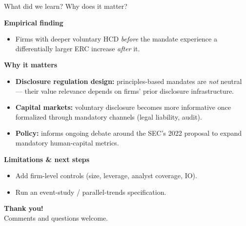 \documentclass[aspectratio=169]{beamer}
\begin{document}
\begin{frame}{What did we learn? Why does it matter?}

\textbf{Empirical finding}
\begin{itemize}
  \item Firms with deeper voluntary HCD \textit{before} the mandate experience a
        differentially larger ERC increase \textit{after} it.
\end{itemize}

\textbf{Why it matters}
\begin{itemize}
  \item \textbf{Disclosure regulation design:} principles-based mandates are
        \textit{not} neutral --- their value relevance depends on firms' prior
        disclosure infrastructure.
  \item \textbf{Capital markets:} voluntary disclosure becomes more informative
        once formalized through mandatory channels (legal liability, audit).
  \item \textbf{Policy:} informs ongoing debate around the SEC's 2022 proposal
        to expand mandatory human-capital metrics.
\end{itemize}

\textbf{Limitations \& next steps}
\begin{itemize}
  \item Add firm-level controls (size, leverage, analyst coverage, IO).
  \item Run an event-study / parallel-trends specification.
\end{itemize}

\end{frame}

\begin{frame}
  \vfill
  \begin{center}
    {\Huge\bfseries\color{OUcrimson} Thank you!}\\[0.8cm]
    {\large Comments and questions welcome.}
  \end{center}
  \vfill
\end{frame}
\end{document}
